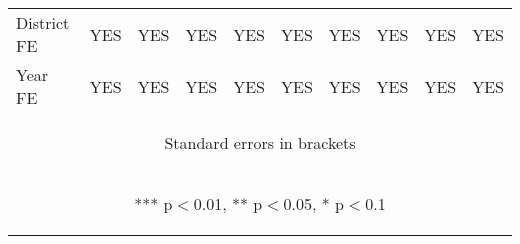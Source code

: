 \begin{center}
\begin{tabular}{lccccccccc}
District FE & YES & YES & YES & YES & YES & YES & YES & YES & YES \\
 Year FE & YES & YES & YES & YES & YES & YES & YES & YES & YES \\ \hline
\multicolumn{10}{c}{\begin{footnotesize} Standard errors in brackets\end{footnotesize}} \\
\multicolumn{10}{c}{\begin{footnotesize} *** p$<$0.01, ** p$<$0.05, * p$<$0.1\end{footnotesize}} \\
\end{tabular}
\end{center}
